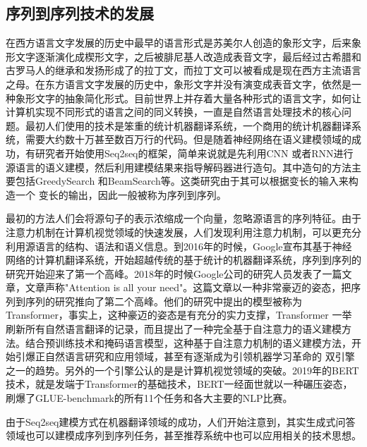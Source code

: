 \documentclass[twoside,a4paper,12pt]{book}%
\begin{document}
\subsection{序列到序列技术的发展}
在西方语言文字发展的历史中最早的语言形式是苏美尔人创造的象形文字，后来象形文字逐渐演化成楔形文字，之后被腓尼基人改造成表音文字，最后经过古希腊和古罗马人的继承和发扬形成了的拉丁文，而拉丁文可以被看成是现在西方主流语言之母。在东方语言文字发展的历史中，象形文字并没有演变成表音文字，依然是一种象形文字的抽象简化形式。目前世界上并存着大量各种形式的语言文字，如何让计算机实现不同形式的语言之间的同义转换，一直是自然语言处理技术的核心问题。最初人们使用的技术是笨重的统计机器翻译系统，一个商用的统计机器翻译系统，需要大约数十万甚至数百万行的代码。但是随着神经网络在语义建模领域的成功，有研究者开始使用Seq2seq的框架，简单来说就是先利用\gls{CNN} 或者\gls{RNN}进行源语言的语义建模，然后利用建模结果来指导解码器进行造句。其中造句的方法主要包括GreedySearch 和BeamSearch等。这类研究由于其可以根据变长的输入来构造一个
变长的输出，因此一般被称为序列到序列。

最初的方法人们会将源句子的表示浓缩成一个向量，忽略源语言的序列特征。由于注意力机制在计算机视觉领域的快速发展，人们发现利用注意力机制，可以更充分利用源语言的结构、语法和语义信息。到2016年的时候，Google宣布其基于神经网络的计算机翻译系统，开始超越传统的基于统计的机器翻译系统，序列到序列的研究开始迎来了第一个高峰。2018年的时候Google公司的研究人员发表了一篇文章，文章声称"Attention is all your need"。这篇文章以一种非常豪迈的姿态，把序列到序列的研究推向了第二个高峰。他们的研究中提出的模型被称为Transformer，事实上，这种豪迈的姿态是有充分的实力支撑，Transformer 一举刷新所有自然语言翻译的记录，而且提出了一种完全基于自注意力的语义建模方法。结合预训练技术和掩码语言模型，这种基于自注意力机制的语义建模方法，开始引爆正自然语言研究和应用领域，甚至有逐渐成为引领机器学习革命的
双引擎之一的趋势。另外的一个引擎公认的是是计算机视觉领域的突破。2019年的\gls{BERT}技术，就是发端于Transformer的基础技术，\gls{BERT}一经面世就以一种碾压姿态，刷爆了GLUE-benchmark的所有11个任务和各大主要的NLP比赛。

由于Seq2seq建模方式在机器翻译领域的成功，人们开始注意到，其实生成式问答领域也可以建模成序列到序列任务，甚至推荐系统中也可以应用相关的技术思想。
\end{document}
